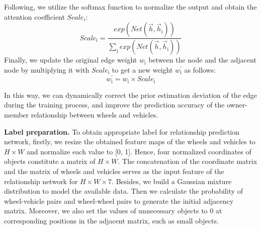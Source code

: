 \documentclass{article}
\begin{document}
Following, we utilize the softmax function to normalize the output and obtain the attention coefficient $Scale_i$:
\setlength\abovedisplayskip{5pt}
\setlength\belowdisplayskip{5pt}
\begin{equation}
Scale_{\text{i}}=\frac{exp(Net(\overrightarrow{h},\overrightarrow{h}_{\text{i}}))}{\sum _{\text{j}}exp(Net(\overrightarrow{h},\overrightarrow{h}_{\text{i}}))}
\label{Eq(4)}
\end{equation}
Finally, we update the original edge weight $w_{\text{i}}$ between the node and the adjacent node by multiplying it with $Scale_{\text{i}}$ to get a new weight $w_{\text{i}}^{'}$ as follows:
\setlength\abovedisplayskip{5pt}
\setlength\belowdisplayskip{5pt}
\begin{equation}
w_{\text{i}}^{'} = w_{\text{i}}\times Scale_{\text{i}}
\label{Eq(5)}
\end{equation}

In this way, we can dynamically correct the prior estimation deviation of the edge during the training process, and improve the prediction accuracy of the owner-member relationship between wheels and vehicles.

\textbf{Label preparation.} To obtain appropriate label for relationship prediction network, firstly, we resize the obtained feature maps of the wheels and vehicles to $H\times W$ and normalize each value to [0, 1]. Hence, four normalized coordinates of objects constitute a matrix of $H\times W$. The concatenation of the coordinate matrix and the matrix of wheels and vehicles serves as the input feature of the relationship network for $H\times W\times \text{7}$. Besides, we build a Gaussian mixture distribution to model the available data. Then we calculate the probability of wheel-vehicle pairs and wheel-wheel pairs to generate the initial adjacency matrix. Moreover, we also set the values of unnecessary objects to 0 at corresponding positions in the adjacent matrix, such as small objects.




\end{document}
